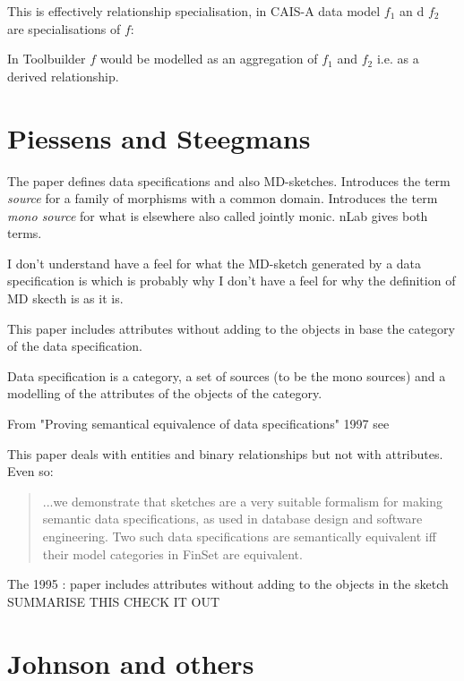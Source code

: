 \documentclass[10pt,a4paper]{scrartcl}
\renewcommand{\erpictureFolder}[0]{../SharedPictures}
\begin{document}
This is effectively relationship specialisation, in CAIS-A
 data model $f_1$ an d $f_2$ are specialisations of $f$: 

\begin{center}

\end{center}
In Toolbuilder $f$ would be modelled as an aggregation of $f_1$ and $f_2$ i.e. as 
a derived relationship.

\section {Piessens and Steegmans}


The paper \cite{piessens1995} defines data specifications and also MD-sketches.
Introduces the term \textit{source} for a family of morphisms with a common domain.
Introduces the term \textit{mono source} 	for what is elsewhere also called jointly monic. nLab gives both terms.

I don't understand have a feel for what the MD-sketch generated by a data specification is which is probably why I don't have a feel for why the definition of MD skecth is as it is. 

This paper includes attributes without adding to the objects in base the category of the data specification.

Data specification is a category, a set of sources (to be the mono sources) and a modelling of the attributes of the objects of the category.


From "Proving semantical equivalence of data specifications" 1997 see \cite{piessens1997}

This paper deals with entities and binary relationships but not with attributes. Even so:
\begin{quote}
...we demonstrate that sketches are a very suitable
formalism for making semantic data specifications, as used in database design and software
engineering. Two such data specifications are semantically equivalent iff their model categories in
FinSet are equivalent. 
\end{quote}

The 1995 : \cite{piessens1995}
paper includes attributes without adding to the objects in the sketch SUMMARISE THIS CHECK IT OUT





\section {Johnson and others}
\end{document}
